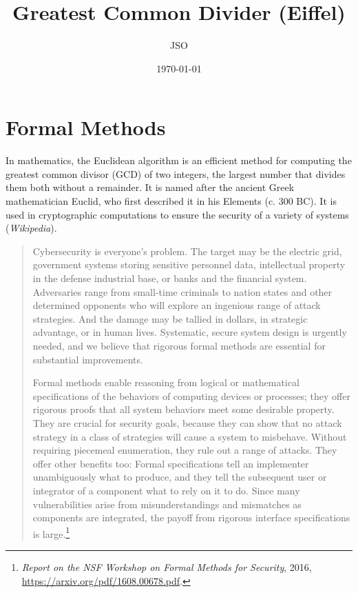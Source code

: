 \documentclass[runningheads,12pt]{article}
\begin{document}
\title{Greatest Common Divider (Eiffel)}
\author{JSO}
\date{\today}

\maketitle
\tableofcontents

\section{Formal Methods}

In mathematics, the Euclidean algorithm is an efficient method for computing the greatest common divisor (GCD) of two integers, the largest number that divides them both without a remainder. It is named after the ancient Greek mathematician Euclid, who first described it in his Elements (c. 300 BC). It is used in cryptographic computations to ensure the security of a variety of systems (\textit{Wikipedia}). 

\begin{quote}
Cybersecurity is everyone’s problem. The target may be the electric grid, government systems storing sensitive personnel data, intellectual property in the defense industrial base, or banks and the financial system. Adversaries range from small-time criminals to nation states and other determined opponents who will explore an ingenious range of attack strategies. And the damage may be tallied in dollars, in strategic advantage, or in human lives. Systematic, secure system design is urgently needed, and we believe that rigorous formal methods are essential for substantial improvements.

Formal methods enable reasoning from logical or mathematical specifications of the behaviors of computing devices or processes; they offer rigorous proofs that all system behaviors meet some desirable property. They are crucial for security goals, because they can show that no attack strategy in a class of strategies will cause a system to misbehave. Without requiring piecemeal enumeration, they rule out a range of attacks. They offer other benefits too: Formal specifications tell an implementer unambiguously what to produce, and they tell the subsequent user or integrator of a component what to rely on it to do. Since many vulnerabilities arise from misunderstandings and mismatches as components are integrated, the payoff from rigorous interface specifications is large.\footnote{%
\textit{Report on the NSF Workshop on Formal Methods for Security}, 2016, \url{https://arxiv.org/pdf/1608.00678.pdf}.}
\end{quote}
\end{document}
